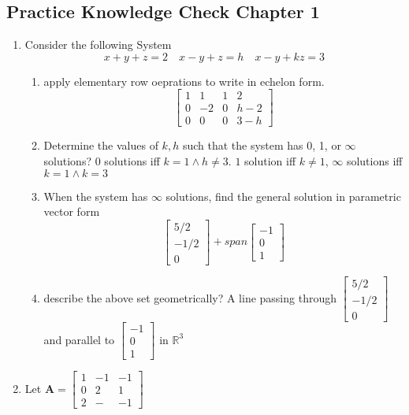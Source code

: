 \documentclass[11pt]{article}
\begin{document}
\subsection{Practice Knowledge Check Chapter 1}
\begin{enumerate}
  \item Consider the following System \[x + y + z = 2 \quad x - y + z = h \quad x - y + kz = 3 \]
        \begin{enumerate}
          \item apply elementary row oeprations to write in echelon form.
                \[\begin{bmatrix} 1 & 1 & 1 & 2 \\ 0 & -2 & 0 & h-2 \\ 0 & 0 & 0 & 3-h \end{bmatrix}\]
          \item Determine the values of $k, h$ such that the system has 0, 1, or $\infty$ solutions?
                $0$ solutions iff $k=1 \land h \neq 3$. $1$ solution iff $k \neq 1$, $\infty$ solutions
                iff $k=1 \land k=3$
          \item When the system has $\infty$ solutions, find the general solution in parametric vector form
                \[\begin{bmatrix} 5/2 \\ -1/2 \\ 0 \end{bmatrix} + span \begin{bmatrix} -1 \\ 0 \\1 \end{bmatrix}\]
          \item describe the above set geometrically?
                A line passing through $\begin{bmatrix} 5/2 \\ -1/2 \\ 0 \end{bmatrix}$ and parallel to $\begin{bmatrix} -1 \\ 0 \\ 1 \end{bmatrix}$
                in $\mathbb{R}^{3}$
        \end{enumerate}
         \item Let $\mathbf{A} = \begin{bmatrix} 1 & -1 & -1 \\ 0 & 2 & 1 \\ 2 & - & -1 \end{bmatrix}$

\end{enumerate}
\end{document}
